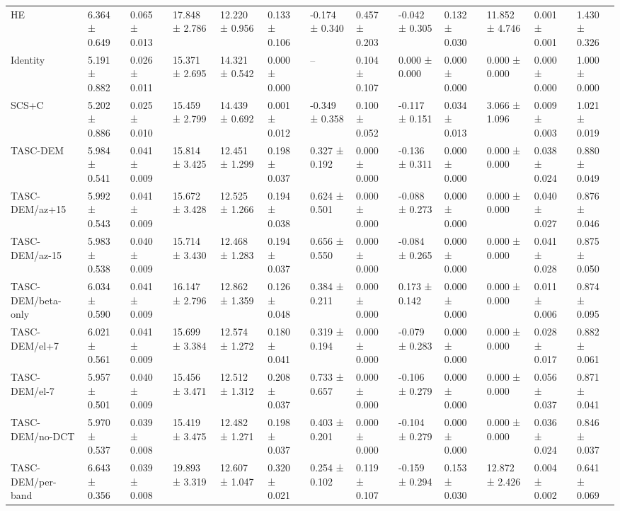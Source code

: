 \begin{table}[t]
\begin{tabular}{lllllllllllll}
HE & 6.364 ± 0.649 & 0.065 ± 0.013 & 17.848 ± 2.786 & 12.220 ± 0.956 & 0.133 ± 0.106 & -0.174 ± 0.340 & 0.457 ± 0.203 & -0.042 ± 0.305 & 0.132 ± 0.030 & 11.852 ± 4.746 & 0.001 ± 0.001 & 1.430 ± 0.326 \\
Identity & 5.191 ± 0.882 & 0.026 ± 0.011 & 15.371 ± 2.695 & 14.321 ± 0.542 & 0.000 ± 0.000 & -- & 0.104 ± 0.107 & 0.000 ± 0.000 & 0.000 ± 0.000 & 0.000 ± 0.000 & 0.000 ± 0.000 & 1.000 ± 0.000 \\
SCS+C & 5.202 ± 0.886 & 0.025 ± 0.010 & 15.459 ± 2.799 & 14.439 ± 0.692 & 0.001 ± 0.012 & -0.349 ± 0.358 & 0.100 ± 0.052 & -0.117 ± 0.151 & 0.034 ± 0.013 & 3.066 ± 1.096 & 0.009 ± 0.003 & 1.021 ± 0.019 \\
TASC-DEM & 5.984 ± 0.541 & 0.041 ± 0.009 & 15.814 ± 3.425 & 12.451 ± 1.299 & 0.198 ± 0.037 & 0.327 ± 0.192 & 0.000 ± 0.000 & -0.136 ± 0.311 & 0.000 ± 0.000 & 0.000 ± 0.000 & 0.038 ± 0.024 & 0.880 ± 0.049 \\
TASC-DEM/az+15 & 5.992 ± 0.543 & 0.041 ± 0.009 & 15.672 ± 3.428 & 12.525 ± 1.266 & 0.194 ± 0.038 & 0.624 ± 0.501 & 0.000 ± 0.000 & -0.088 ± 0.273 & 0.000 ± 0.000 & 0.000 ± 0.000 & 0.040 ± 0.027 & 0.876 ± 0.046 \\
TASC-DEM/az-15 & 5.983 ± 0.538 & 0.040 ± 0.009 & 15.714 ± 3.430 & 12.468 ± 1.283 & 0.194 ± 0.037 & 0.656 ± 0.550 & 0.000 ± 0.000 & -0.084 ± 0.265 & 0.000 ± 0.000 & 0.000 ± 0.000 & 0.041 ± 0.028 & 0.875 ± 0.050 \\
TASC-DEM/beta-only & 6.034 ± 0.590 & 0.041 ± 0.009 & 16.147 ± 2.796 & 12.862 ± 1.359 & 0.126 ± 0.048 & 0.384 ± 0.211 & 0.000 ± 0.000 & 0.173 ± 0.142 & 0.000 ± 0.000 & 0.000 ± 0.000 & 0.011 ± 0.006 & 0.874 ± 0.095 \\
TASC-DEM/el+7 & 6.021 ± 0.561 & 0.041 ± 0.009 & 15.699 ± 3.384 & 12.574 ± 1.272 & 0.180 ± 0.041 & 0.319 ± 0.194 & 0.000 ± 0.000 & -0.079 ± 0.283 & 0.000 ± 0.000 & 0.000 ± 0.000 & 0.028 ± 0.017 & 0.882 ± 0.061 \\
TASC-DEM/el-7 & 5.957 ± 0.501 & 0.040 ± 0.009 & 15.456 ± 3.471 & 12.512 ± 1.312 & 0.208 ± 0.037 & 0.733 ± 0.657 & 0.000 ± 0.000 & -0.106 ± 0.279 & 0.000 ± 0.000 & 0.000 ± 0.000 & 0.056 ± 0.037 & 0.871 ± 0.041 \\
TASC-DEM/no-DCT & 5.970 ± 0.537 & 0.039 ± 0.008 & 15.419 ± 3.475 & 12.482 ± 1.271 & 0.198 ± 0.037 & 0.403 ± 0.201 & 0.000 ± 0.000 & -0.104 ± 0.279 & 0.000 ± 0.000 & 0.000 ± 0.000 & 0.036 ± 0.024 & 0.846 ± 0.037 \\
TASC-DEM/per-band & 6.643 ± 0.356 & 0.039 ± 0.008 & 19.893 ± 3.319 & 12.607 ± 1.047 & 0.320 ± 0.021 & 0.254 ± 0.102 & 0.119 ± 0.107 & -0.159 ± 0.294 & 0.153 ± 0.030 & 12.872 ± 2.426 & 0.004 ± 0.002 & 0.641 ± 0.069 \\

\end{tabular}
\end{table}
